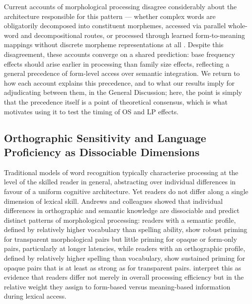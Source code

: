 \documentclass[utf8]{FrontiersinHarvard} %
\begin{document}
	Current accounts of morphological processing disagree considerably about the architecture responsible for this pattern --- whether complex words are obligatorily decomposed into constituent morphemes, accessed via parallel whole-word and decompositional routes, or processed through learned form-to-meaning mappings without discrete morpheme representations at all \citep{schreuderModelingMorphologicalProcessing1995, dejongMorphologicalFamilySize2000, taft_lexical_1975, taftMorphologicalDecompositionReverse2004, rastleMorphologicalDecompositionBased2008, longtinMorphologicalDecompositionEarly2005, morrisSemanticTransparencyMasked2007, chuangDiscriminativeLearningLexicon}. Despite this disagreement, these accounts converge on a shared prediction: base frequency effects should arise earlier in processing than family size effects, reflecting a general precedence of form-level access over semantic integration. We return to how each account explains this precedence, and to what our results imply for adjudicating between them, in the General Discussion; here, the point is simply that the precedence itself is a point of theoretical consensus, which is what motivates using it to test the timing of OS and LP effects.

	\subsection{Orthographic Sensitivity and Language Proficiency as Dissociable Dimensions}

	Traditional models of word recognition typically characterise processing at the level of the skilled reader in general, abstracting over individual differences in favour of a uniform cognitive architecture. Yet readers do not differ along a single dimension of lexical skill. Andrews and colleagues \citep{andrewsIndividualDifferencesSkilled2012, andrewsMorphologicalPrimingStronger2013} showed that individual differences in orthographic and semantic knowledge are dissociable and predict distinct patterns of morphological processing: readers with a semantic profile, defined by relatively higher vocabulary than spelling ability, show robust priming for transparent morphological pairs but little priming for opaque or form-only pairs, particularly at longer latencies, while readers with an orthographic profile, defined by relatively higher spelling than vocabulary, show sustained priming for opaque pairs that is at least as strong as for transparent pairs. \citet{andrewsMorphologicalPrimingStronger2013} interpret this as evidence that readers differ not merely in overall processing efficiency but in the relative weight they assign to form-based versus meaning-based information during lexical access.
\end{document}

